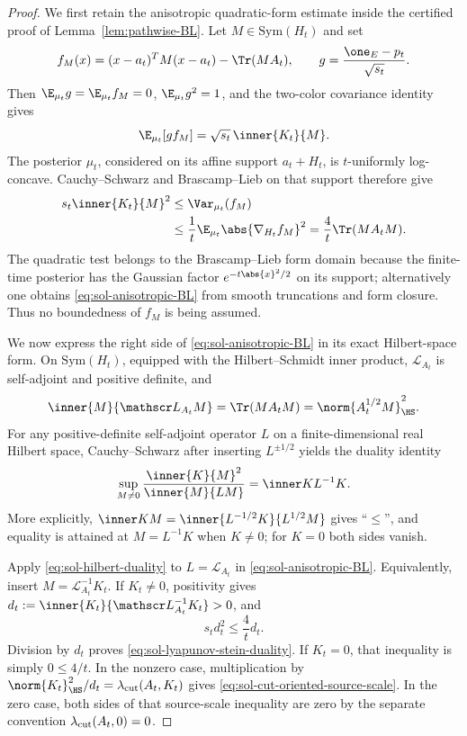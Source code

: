 \documentclass[../main.tex]{subfiles}
\begin{document}
\begin{proof}
We first retain the anisotropic quadratic-form estimate inside the certified proof of
Lemma~\ref{lem:pathwise-BL}.  Let $M\in\mathrm{Sym}(H_t)$ and set
\[
 f_M(x)=(x-a_t)^TM(x-a_t)-\Tr(MA_t),
 \qquad
 g=\frac{\one_E-p_t}{\sqrt{s_t}}.
\]
Then $\E_{\mu_t}g=\E_{\mu_t}f_M=0$, $\E_{\mu_t}g^2=1$, and the two-color covariance
identity gives
\begin{equation}\label{eq:sol-anisotropic-color-pairing}
 \E_{\mu_t}[g f_M]=\sqrt{s_t}\,\inner{K_t}{M}.
\end{equation}
The posterior $\mu_t$, considered on its affine support $a_t+H_t$, is
$t$-uniformly log-concave.  Cauchy--Schwarz and Brascamp--Lieb on that support
\cite{BrascampLieb1976} therefore give
\begin{align}
 s_t\inner{K_t}{M}^2
 &\le \Var_{\mu_t}(f_M)\notag\\
 &\le \frac1t\E_{\mu_t}\abs{\nabla_{H_t}f_M}^2
 =\frac4t\Tr(MA_tM).\label{eq:sol-anisotropic-BL}
\end{align}
The quadratic test belongs to the Brascamp--Lieb form domain because the finite-time posterior
has the Gaussian factor $e^{-t\abs{x}^2/2}$ on its support; alternatively one obtains
\eqref{eq:sol-anisotropic-BL} from smooth truncations and form closure.  Thus no boundedness of
$f_M$ is being assumed.

We now express the right side of \eqref{eq:sol-anisotropic-BL} in its exact Hilbert-space form.
On $\mathrm{Sym}(H_t)$, equipped with the Hilbert--Schmidt inner product,
$\mathscr L_{A_t}$ is self-adjoint and positive definite, and
\begin{equation}\label{eq:sol-lyapunov-energy}
 \inner{M}{\mathscr L_{A_t}M}
 =\Tr(MA_tM)
 =\norm{A_t^{1/2}M}_{\HS}^2.
\end{equation}
For any positive-definite self-adjoint operator $L$ on a finite-dimensional real Hilbert space,
Cauchy--Schwarz after inserting $L^{\pm1/2}$ yields the duality identity
\begin{equation}\label{eq:sol-hilbert-duality}
 \sup_{M\ne0}\frac{\inner{K}{M}^2}{\inner{M}{LM}}
 =\inner K{L^{-1}K}.
\end{equation}
More explicitly,
$\inner KM=\inner{L^{-1/2}K}{L^{1/2}M}$ gives ``$\le$'', and equality is attained at
$M=L^{-1}K$ when $K\ne0$; for $K=0$ both sides vanish.

Apply \eqref{eq:sol-hilbert-duality} to $L=\mathscr L_{A_t}$ in
\eqref{eq:sol-anisotropic-BL}.  Equivalently, insert
$M=\mathscr L_{A_t}^{-1}K_t$.  If $K_t\ne0$, positivity gives
$d_t:=\inner{K_t}{\mathscr L_{A_t}^{-1}K_t}>0$, and
\[
 s_t d_t^2\le\frac4t d_t.
\]
Division by $d_t$ proves \eqref{eq:sol-lyapunov-stein-duality}.  If $K_t=0$, that inequality
is simply $0\le4/t$.  In the nonzero case, multiplication by
$\norm{K_t}_{\HS}^2/d_t=\lambda_{\rm cut}(A_t,K_t)$ gives
\eqref{eq:sol-cut-oriented-source-scale}.  In the zero case, both sides of that source-scale
inequality are zero by the separate convention $\lambda_{\rm cut}(A_t,0)=0$.


\end{proof}
\end{document}
